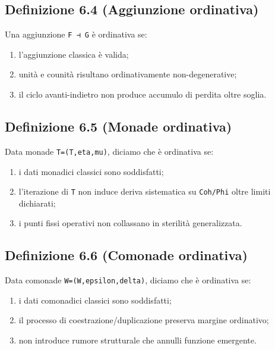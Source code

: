 \subsection{Definizione 6.4 (Aggiunzione ordinativa)}

Una aggiunzione \texttt{F\ ⊣\ G} è ordinativa se:

\begin{enumerate}
\def\labelenumi{\arabic{enumi}.}
\tightlist
\item
  l'aggiunzione classica è valida;
\item
  unità e counità risultano ordinativamente non-degenerative;
\item
  il ciclo avanti-indietro non produce accumulo di perdita oltre soglia.
\end{enumerate}

\subsection{Definizione 6.5 (Monade ordinativa)}

Data monade \texttt{T=(T,eta,mu)}, diciamo che è ordinativa se:

\begin{enumerate}
\def\labelenumi{\arabic{enumi}.}
\tightlist
\item
  i dati monadici classici sono soddisfatti;
\item
  l'iterazione di \texttt{T} non induce deriva sistematica su \texttt{Coh/Phi} oltre limiti dichiarati;
\item
  i punti fissi operativi non collassano in sterilità generalizzata.
\end{enumerate}

\subsection{Definizione 6.6 (Comonade ordinativa)}

Data comonade \texttt{W=(W,epsilon,delta)}, diciamo che è ordinativa se:

\begin{enumerate}
\def\labelenumi{\arabic{enumi}.}
\tightlist
\item
  i dati comonadici classici sono soddisfatti;
\item
  il processo di coestrazione/duplicazione preserva margine ordinativo;
\item
  non introduce rumore strutturale che annulli funzione emergente.
\end{enumerate}


